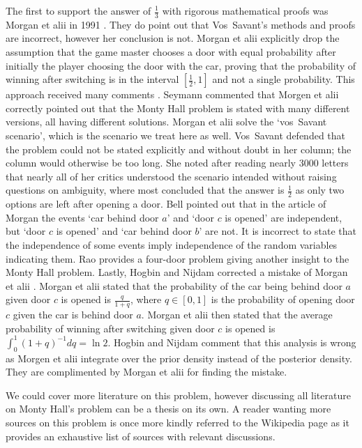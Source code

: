 \documentclass[a4paper]{report}
\theoremstyle{plain}
\theoremstyle{definition}
\theoremstyle{remark}
\numberwithin{equation}{chapter}
\DeclareMathOperator{\1}{\mathbbm{1}}
\begin{document}
The first to support the answer of $\frac{1}{3}$ with rigorous mathematical proofs was Morgan et alii in 1991 \cite{Morgan91a}. They do point out that Vos~Savant's methods and proofs are incorrect, however her conclusion is not. Morgan et alii explicitly drop the assumption that the game master chooses a door with equal probability after initially the player choosing the door with the car, proving that the probability of winning after switching is in the interval $\left[\frac{1}{2},1\right]$ and not a single probability. This approach received many comments \cite{Seymann91,Morgan91b,Savant91c,Bell92,Rao92,Hogbin10}. Seymann \cite{Seymann91} commented that Morgen et alii correctly pointed out that the Monty Hall problem is stated with many different versions, all having different solutions. Morgan et alii solve the `vos~Savant scenario', which is the scenario we treat here as well. Vos~Savant \cite{Savant91c} defended that the problem could not be stated explicitly and without doubt in her column; the column would otherwise be too long. She noted after reading nearly 3000 letters that nearly all of her critics understood the scenario intended without raising questions on ambiguity, where most concluded that the answer is $\frac{1}{2}$ as only two options are left after opening a door. Bell \cite{Bell92} pointed out that in the article of Morgan the events `car behind door $a$' and `door $c$ is opened' are independent, but `door $c$ is opened' and `car behind door $b$' are not. It is incorrect to state that the independence of some events imply independence of the random variables indicating them. Rao \cite{Rao92} provides a four-door problem giving another insight to the Monty Hall problem. Lastly, Hogbin and Nijdam \cite{Hogbin10} corrected a mistake of Morgan et alii \cite{Morgan91a}. Morgan et alii stated that the probability of the car being behind door $a$ given door $c$ is opened is $\frac{q}{1+q}$, where $q\in[0,1]$ is the probability of opening door $c$ given the car is behind door $a$. Morgan et alii then stated that the average probability of winning after switching given door $c$ is opened is $\int_0^1(1+q)^{-1}dq=\ln2$. Hogbin and Nijdam comment that this analysis is wrong as Morgen et alii integrate over the prior density instead of the posterior density. They are complimented by Morgan et alii \cite{Hogbin10} for finding the mistake.

We could cover more literature on this problem, however discussing all literature on Monty Hall's problem can be a thesis on its own. A reader wanting more sources on this problem is once more kindly referred to the Wikipedia page \cite{WikiMonty} as it provides an exhaustive list of sources with relevant discussions.
\end{document}
